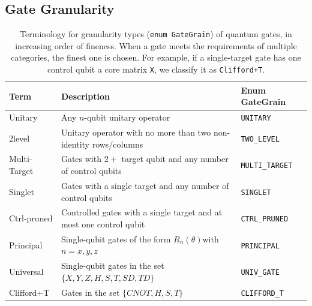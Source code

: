 \documentclass[a4paper,titlepage]{article}
\begin{document}
    \subsection{Gate Granularity}\label{subsec:granularity}

    \begin{table}[htbp]
        \centering
        \caption{Terminology for granularity types (\texttt{enum GateGrain}) of quantum gates, in increasing order of fineness.
        When a gate meets the requirements of multiple categories, the finest one is chosen.
        For example, if a single-target gate has one control qubit a core matrix \texttt{X},
            we classify it as \texttt{Clifford+T}.
        }
        \begin{tabularx}{.9\textwidth}{l|X|l}
            \hline
            \textbf{Term} & \textbf{Description}                                                           & \textbf{Enum GateGrain}\\
            \hline
            Unitary       & Any $n$-qubit unitary operator                                                 & \texttt{UNITARY}       \\
            2level        & Unitary operator with no more than two non-identity rows/columns               & \texttt{TWO\_LEVEL}    \\
            Multi-Target  & Gates with $2+$ target qubit and any number of control qubits                  & \texttt{MULTI\_TARGET} \\
            Singlet       & Gates with a single target and any number of control qubits                    & \texttt{SINGLET}       \\
            Ctrl-pruned   & Controlled gates with a single target and at most one control qubit            & \texttt{CTRL\_PRUNED}  \\
            Principal     & Single-qubit gates of the form $R_n(\theta)$with $n=x,y,z$                     & \texttt{PRINCIPAL}     \\
            Universal     & Single-qubit gates in the set $\{X, Y, Z, H, S, T, \mathit{SD}, \mathit{TD}\}$ & \texttt{UNIV\_GATE}    \\
            Clifford+T    & Gates in the set $\{\mathit{CNOT}, H, S, T\}$                                  & \texttt{CLIFFORD\_T}   \\
            \hline
        \end{tabularx}
        \label{tab:terminology}
    \end{table}
\end{document}
